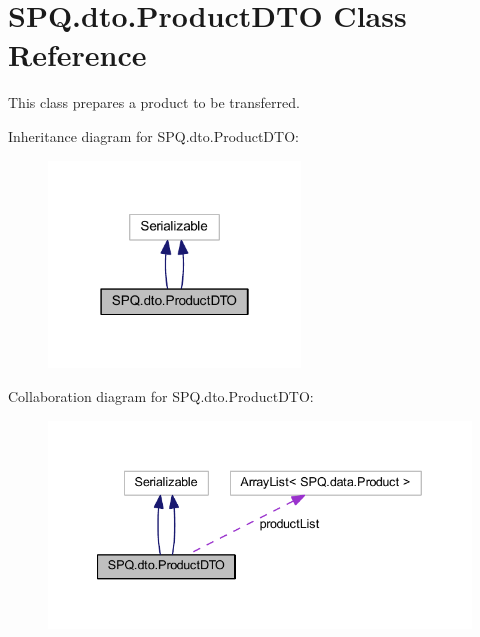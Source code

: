 \hypertarget{class_s_p_q_1_1dto_1_1_product_d_t_o}{}\section{S\+P\+Q.\+dto.\+Product\+D\+TO Class Reference}
\label{class_s_p_q_1_1dto_1_1_product_d_t_o}


This class prepares a product to be transferred.  




Inheritance diagram for S\+P\+Q.\+dto.\+Product\+D\+TO\+:\nopagebreak
\begin{figure}[H]
\begin{center}
\leavevmode
\includegraphics[width=190pt]{class_s_p_q_1_1dto_1_1_product_d_t_o__inherit__graph}
\end{center}
\end{figure}


Collaboration diagram for S\+P\+Q.\+dto.\+Product\+D\+TO\+:\nopagebreak
\begin{figure}[H]
\begin{center}
\leavevmode
\includegraphics[width=340pt]{class_s_p_q_1_1dto_1_1_product_d_t_o__coll__graph}
\end{center}
\end{figure}
